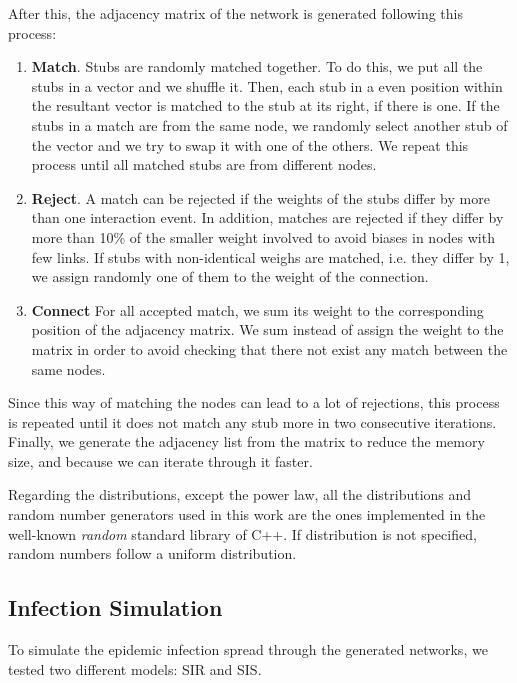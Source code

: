 After this, the adjacency matrix of the network is generated following this process:
\begin{enumerate}
    \item \textbf{Match}. Stubs are randomly matched together. To do this, we put all the stubs in a vector and we shuffle it. Then, each stub in a even position within the resultant vector is matched to the stub at its right, if there is one. If the stubs in a match are from the same node, we randomly select another stub of the vector and we try to swap it with one of the others. We repeat this process until all matched stubs are from different nodes.
    \item \textbf{Reject}. A match can be rejected if the weights of the stubs differ by more than one interaction event. In addition, matches are rejected if they differ by more than 10\% of the smaller weight involved to avoid biases in nodes with few links. If stubs with non-identical weighs are matched, i.e. they differ by 1, we assign randomly one of them to the weight of the connection.
    \item \textbf{Connect} For all accepted match, we sum its weight to the corresponding position of the adjacency matrix. We sum instead of assign the weight to the matrix in order to avoid checking that there not exist any match between the same nodes.
\end{enumerate}
Since this way of matching the nodes can lead to a lot of rejections, this process is repeated until it does not match any stub more in two consecutive iterations. Finally, we generate the adjacency list from the matrix to reduce the memory size, and because we can iterate through it faster.

Regarding the distributions, except the power law, all the distributions and random number generators used in this work are the ones implemented in the well-known \textit{random} standard library of C++. If distribution is not specified, random numbers follow a uniform distribution.

\subsection{Infection Simulation}
To simulate the epidemic infection spread through the generated networks, we tested two different models: SIR and SIS.
